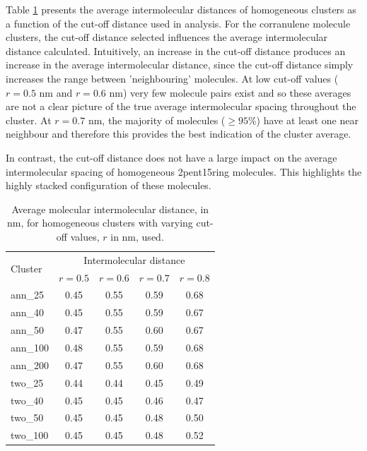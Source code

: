 Table \ref{tableSI:intermolecdistscutoff} presents the average intermolecular distances of homogeneous clusters as a function of the cut-off distance used in analysis. For the corranulene molecule clusters, the cut-off distance selected influences the average intermolecular distance calculated.  Intuitively, an increase in the cut-off distance produces an increase in the average intermolecular distance, since the cut-off distance simply increases the range between 'neighbouring' molecules. At low cut-off values ($r = 0.5$ nm and $r = 0.6$ nm) very few molecule pairs exist and so these averages are not a clear picture of the true average intermolecular spacing throughout the cluster.  At $r = 0.7$ nm, the majority of molecules ($\ge 95$\%) have at least one near neighbour and therefore this provides the best indication of the cluster average.

In contrast, the cut-off distance does not have a large impact on the average intermolecular spacing of homogeneous 2pent15ring molecules.  This highlights the highly stacked configuration of these molecules.




% 
\begin{table}[]
\centering
\caption{Average molecular intermolecular distance, in nm, for homogeneous clusters with varying cut-off values, $r$ in nm, used.}
\label{tableSI:intermolecdistscutoff}
\begin{tabular}{lcccc}
\hline
\multicolumn{1}{l}{\multirow{2}{*}{Cluster}} & \multicolumn{4}{c}{\multirow{1}{*}{Intermolecular distance}} \\
 & $r = 0.5$ & $r = 0.6$ & $r = 0.7$ & $r = 0.8$ \\ \hline
ann\_25 & 0.45 & 0.55 & 0.59 & 0.68 \\
ann\_40 & 0.45 & 0.55 & 0.59 & 0.67 \\
ann\_50 & 0.47 & 0.55 & 0.60 & 0.67 \\
ann\_100 & 0.48 & 0.55 & 0.59 & 0.68 \\
ann\_200 & 0.47 & 0.55 & 0.60 & 0.68 \\ \hline
two\_25 & 0.44 & 0.44 & 0.45 & 0.49 \\
two\_40 & 0.45 & 0.45 & 0.46 & 0.47 \\
two\_50 & 0.45 & 0.45 & 0.48 & 0.50 \\ 
two\_100 & 0.45 & 0.45 & 0.48 & 0.52 \\ \hline
\end{tabular}
\end{table}
%





